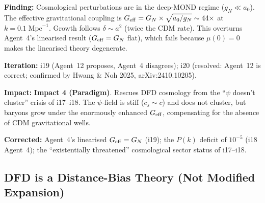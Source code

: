 \documentclass[11pt,a4paper]{article}
\newcommand{\impfour}{\textcolor{impact4}{\textbf{Impact 4 (Paradigm)}}}
\begin{document}
\begin{tcolorbox}[colback=red!5!white, colframe=red!70!black,
  title=\textbf{Deep-MOND $G_{\rm eff}$ Rescue --- Iterations 19--21}]

\textbf{Finding:} Cosmological perturbations are in the deep-MOND regime
($g_N \ll a_0$). The effective gravitational coupling is
$G_{\rm eff} = G_N \times \sqrt{a_0 / g_N} \sim 44\times$ at
$k = 0.1\;\mathrm{Mpc}^{-1}$. Growth follows $\delta \sim a^2$ (twice
the CDM rate). This overturns Agent~4's linearised result
($G_{\rm eff} = G_N$ flat), which fails because $\mu(0) = 0$ makes
the linearised theory degenerate.

\textbf{Iteration:} i19 (Agent~12 proposes, Agent~4 disagrees); i20
(resolved: Agent~12 is correct; confirmed by Hwang \& Noh 2025,
arXiv:2410.10205).

\textbf{Impact:} \impfour. Rescues DFD cosmology from the ``$\psi$
doesn't cluster'' crisis of i17--i18. The $\psi$-field is stiff
($c_s \sim c$) and does not cluster, but baryons grow under the
enormously enhanced $G_{\rm eff}$, compensating for the absence of CDM
gravitational wells.

\textbf{Corrected:} Agent~4's linearised $G_{\rm eff} = G_N$ (i19);
the $P(k)$ deficit of $10^{-5}$ (i18 Agent~4); the ``existentially
threatened'' cosmological sector status of i17--i18.

\end{tcolorbox}

\subsection{DFD is a Distance-Bias Theory (Not Modified Expansion)}
\label{sec:distance-bias}
\end{document}

